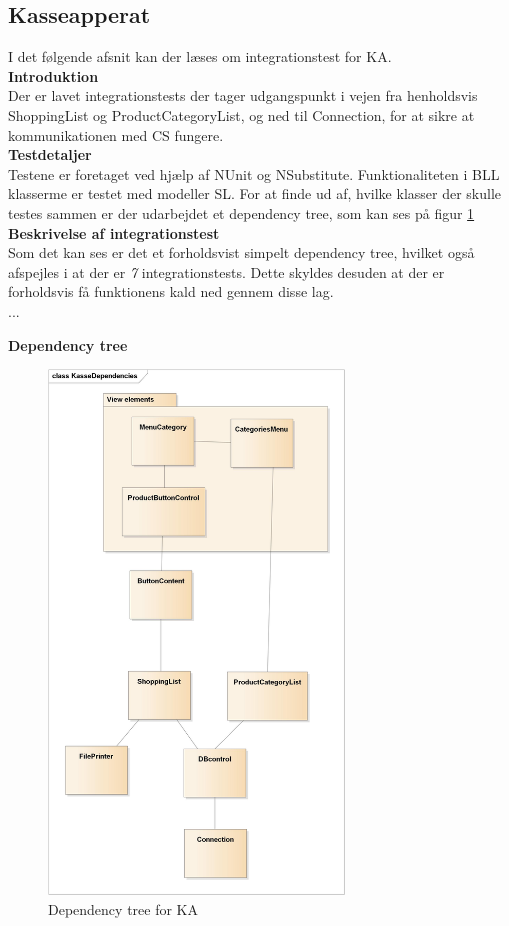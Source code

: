 \subsection{Kasseapperat}
I det følgende afsnit kan der læses om integrationstest for \gls{KA}.\\

\textbf{Introduktion}\\
Der er lavet integrationstests der tager udgangspunkt i vejen fra henholdsvis ShoppingList og ProductCategoryList, og ned til Connection, for at sikre at kommunikationen med \gls{CS} fungere.\\

\textbf{Testdetaljer}\\
Testene er foretaget ved hjælp af NUnit og NSubstitute. Funktionaliteten i BLL klasserme er testet med modeller \gls{SL}. For at finde ud af, hvilke klasser der skulle testes sammen er der udarbejdet et dependency tree, som kan ses på figur \ref{fig:KA-dependencies}\\

\textbf{Beskrivelse af integrationstest}\\
Som det kan ses er det et forholdsvist simpelt dependency tree, hvilket også afspejles i at der er \textit{7} integrationstests. Dette skyldes desuden at der er forholdsvis få funktionens kald ned gennem disse lag.\\
... %

\textbf{Dependency tree}
\begin{figure}[H]
	\centering
	\includegraphics[width=0.7\textwidth]{Test/Integrationstest/Images/KasseDependencies}
	\caption{Dependency tree for \gls{KA}}
	\label{fig:KA-dependencies}
\end{figure}

